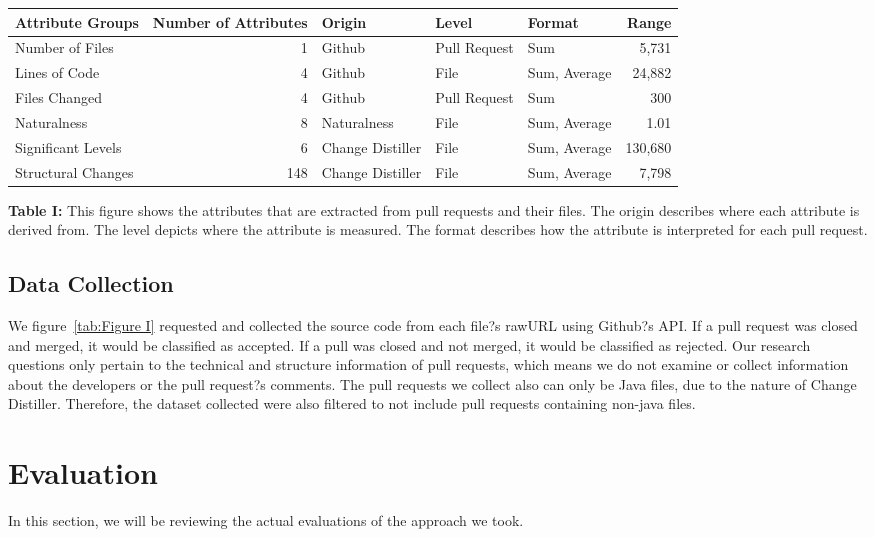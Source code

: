 \documentclass[10pt, conference]{IEEEtran}
\begin{document}
\begin{table*}[t]
  \centering
  \caption{List of Attributes (Metrics of Change)}
  \label{tab:Figure I}
  \begin{tabular}{l|rlllr}
    \toprule
    \textbf{Attribute Groups} & \textbf{Number of Attributes} & \textbf{Origin} & \textbf{Level} & \textbf{Format} & \textbf{Range}\\ %
    \midrule
    Number of Files & 1 & Github & Pull Request & Sum & 5,731 \\ %
    Lines of Code & 4 & Github & File & Sum, Average & 24,882 \\ %
    Files Changed & 4 & Github & Pull Request & Sum & 300 \\ %
    Naturalness & 8 & Naturalness & File & Sum, Average & 1.01\\ %
    Significant Levels & 6 & Change Distiller & File & Sum, Average &130,680 \\ %
     Structural Changes & 148 & Change Distiller & File & Sum, Average & 7,798 \\ %
    \bottomrule
  \end{tabular}
  \break
  \newline
\textbf{Table I:} This figure shows the attributes that are extracted from pull requests and their files. The origin describes where each attribute is derived from. The level depicts where the attribute is measured. The format describes how the attribute is interpreted for each pull request.
\end{table*}

\subsection{Data Collection}
We figure~\ref{tab:Figure I} requested and collected the source code from each file?s rawURL using Github?s API. If a pull request was closed and merged, it would be classified as accepted. If a pull was closed and not merged, it would be classified as rejected. Our research questions only pertain to the technical and structure information of pull requests, which means we do not examine or collect information about the developers or the pull request?s comments. The pull requests we collect also can only be Java files, due to the nature of Change Distiller. Therefore, the dataset collected were also filtered to not include pull requests containing non-java files.

\section{Evaluation}
In this section, we will be reviewing the actual evaluations of the approach we took.
\end{document}
